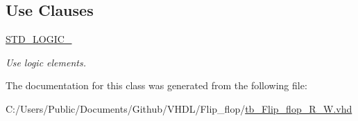 \subsection*{Use Clauses}
 \begin{DoxyCompactItemize}
\item 
\hyperlink{classtb___flip__flop___r___w_aa4b2b25246a821511120e3149b003563}{S\+T\+D\+\_\+\+L\+O\+G\+I\+C\+\_}   \hypertarget{classtb___flip__flop___r___w_aa4b2b25246a821511120e3149b003563}{}\label{classtb___flip__flop___r___w_aa4b2b25246a821511120e3149b003563}

\begin{DoxyCompactList}\small\item\em Use logic elements. \end{DoxyCompactList}\end{DoxyCompactItemize}


The documentation for this class was generated from the following file\+:\begin{DoxyCompactItemize}
\item 
C\+:/\+Users/\+Public/\+Documents/\+Github/\+V\+H\+D\+L/\+Flip\+\_\+flop/\hyperlink{tb___flip__flop___r___w_8vhd}{tb\+\_\+\+Flip\+\_\+flop\+\_\+\+R\+\_\+\+W.\+vhd}\end{DoxyCompactItemize}
